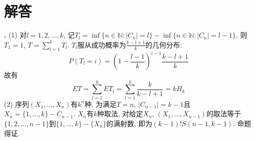 \section*{解答}
\par \textbf{\thesolprob .} (1) \cite{MaP} 对$l=1,2,\dots,k$, 记$T_l = \inf \{n\in \mathbb{N}: |C_n| = l\} - \inf \{n\in \mathbb{N}: |C_n| = l-1\}$, 则$T_1=1$, $T=\sum_{l=1}^k T_l$. $T_l$服从成功概率为$\frac{k-l+1}{k}$的几何分布:
\begin{equation}
    P(T_l=i)=\left(1-\frac{l-1}{k}\right)^{i-1} \frac{k-l+1}{k}
\end{equation}
故有
\begin{equation}
    ET=\sum_{l=1}^k ET_l = \sum_{l=1}^k \frac{k}{k-l+1} = kH_k
\end{equation}
(2) 序列$(X_1,\dots,X_n)$有$k^n$种. 为满足$T=n$, $|C_{n-1}|=k-1$且$X_n = \{1,\dots,k\} - C_{n-1}$. $X_n$有$k$种取法, 对给定$X_n$, $(X_1,\dots,X_{n-1})$的取法等于$\{1,2,\dots,n-1\}$到$\{1,\dots,k\}-\{X_n\}$的满射数, 即为$(k-1)! S(n-1,k-1)$. 命题得证. 
